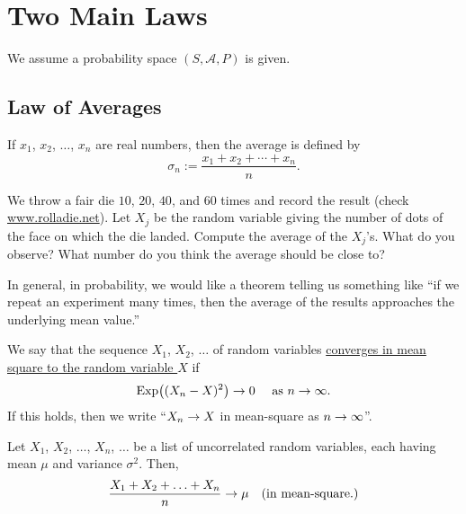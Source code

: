 \chapter{Two Main Laws}

We assume a probability space $(S, \mathcal{A}, P)$ is given.

\section{Law of Averages}

\begin{definition}
If $x_1$, $x_2$, $\ldots$, $x_n$ are real numbers, then the average is defined by
    \[
        \sigma_n := \frac{x_1 + x_2 + \cdots + x_n}{n} .
    \]
\end{definition}

\begin{example}
We throw a fair die $10$, $20$, $40$, and $60$ times and record the result (check \url{www.rolladie.net}). Let $X_j$ be the random variable giving the number of dots of the face on which the die landed. Compute the average of the $X_j$'s. What do you observe? What number do you think the average should be close to?
\end{example}

In general, in probability, we would like a theorem telling us something like ``if we repeat an experiment many times, then the average of the results approaches the underlying mean value.''

\begin{definition}
We say that the sequence $X_1$, $X_2$, $\ldots$ of random variables \underline{converges in mean} \underline{square to the random variable $X$} if
    \[
        \mathrm{Exp} \big( (X_n - X)^2 \big) \rightarrow 0 \quad \text{ as } n \rightarrow \infty.
    \]
If this holds, then we write ``$X_n \rightarrow X$ in mean-square as $n \rightarrow \infty$''.
\end{definition}

\begin{theorem}

Let $X_1$, $X_2$, $\ldots$, $X_n$, $\ldots$ be a list of uncorrelated random variables, each having mean $\mu$ and variance $\sigma^2$. Then,
    \[
        \frac{X_1 + X_2 + \ldots + X_n}{n} \rightarrow \mu \quad \text{(in mean-square.)}
    \]
\end{theorem}

